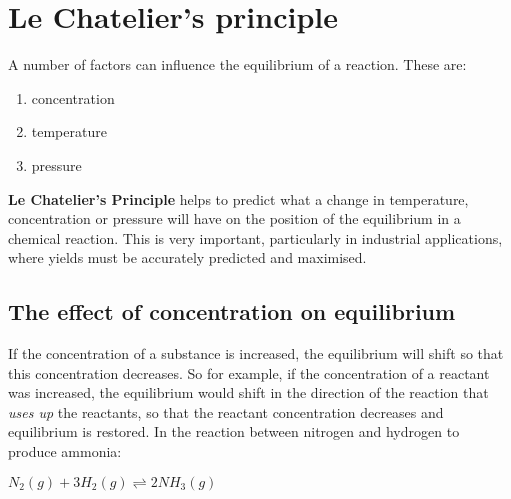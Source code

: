 



\section{Le Chatelier's principle}
\label{sec:reactionrates:lechatelier}

A number of factors can influence the equilibrium of a reaction. These are:
\begin{enumerate}
\item concentration
\item temperature
\item pressure
\end{enumerate}

\textbf{Le Chatelier's Principle} helps to predict what a change in temperature, concentration or pressure will have on the position of the equilibrium in a chemical reaction. This is very important, particularly in industrial applications, where yields must be accurately predicted and maximised.


\subsection{The effect of concentration on equilibrium}

If the concentration of a substance is increased, the equilibrium will shift so that this concentration decreases. So for example, if the concentration of a reactant was increased, the equilibrium would shift in the direction of the reaction that \textit{uses up} the reactants, so that the reactant concentration decreases and equilibrium is restored. In the reaction between nitrogen and hydrogen to produce ammonia:

\begin{center}
\rm${N_{2}(g) + 3H_{2}(g) \rightleftharpoons 2NH_{3}(g)}$ 
\end{center}

